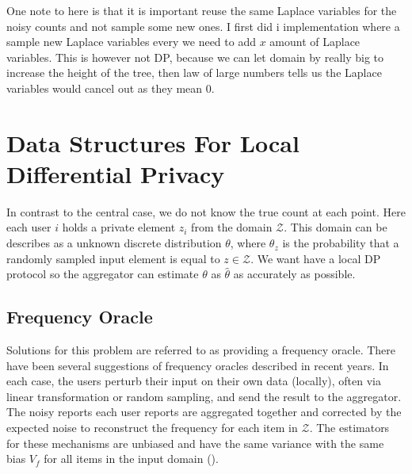 \documentclass[11pt]{article}
\theoremstyle{definition}
\begin{document}
One note to here is that it is important reuse the same Laplace variables for the noisy counts and not sample some new ones. I first did i implementation where a sample new Laplace variables every we need to add $x$ amount of Laplace variables. This is however not DP, because we can let domain by really big to increase the height of the tree, then law of large numbers tells us the Laplace variables would cancel out as they mean $0$.

\section{Data Structures For Local Differential Privacy}
In contrast to the central case, we do not know the true count at each point.
Here each user $i$ holds a private element $z_i$ from the domain $\mathcal{Z}$. This domain can be describes as a unknown discrete distribution $\theta$, where $\theta_z$ is the probability that a randomly sampled input element is equal to $z\in\mathcal{Z}$. We want have a local DP protocol so the aggregator can estimate $\theta$ as $\hat{\theta}$ as accurately as possible.
\subsection{Frequency Oracle}\label{freq}
Solutions for this problem are referred to as providing a frequency oracle. There have been several suggestions of frequency oracles described in recent years. In each case, the users perturb their input on their own data (locally), often via linear transformation or random sampling, and send the result to the aggregator. The noisy reports each user reports are aggregated together and corrected by the expected noise to reconstruct the frequency for each item in $\mathcal{Z}$. The estimators for these mechanisms are unbiased and have the same variance with the same bias $V_f$ for all items in the input domain (\cite[3]{local}). \\
\end{document}
